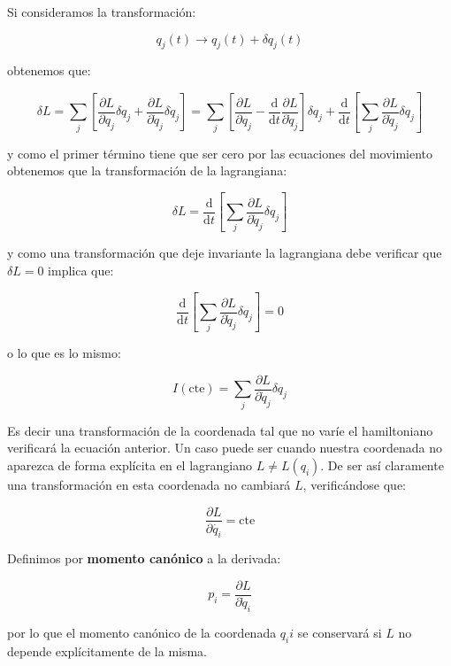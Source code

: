 \documentclass[12pt,a4paper]{book}
\newcommand{\parciales}[2]{\frac{\partial #1}{\partial #2}}
\newcommand{\ccorchetes}[1]{\left[ #1  \right]}
\newcommand{\D}{\mathrm{d}}
\begin{document}
Si consideramos la transformación:

\begin{equation}
q_j (t)   \longrightarrow q_j (t) + \delta q_j (t)
\end{equation}

obtenemos que:

\begin{equation}
\delta L = \sum_j \ccorchetes{\parciales{L}{q_j} \delta q_j + \parciales{L}{\dot{q}_j} \delta \dot{q}_j } = \sum_j \ccorchetes{\parciales{L}{q_j} - \dfrac{\D}{\D t} \parciales{L}{\dot{q}_j} } \delta q_j + \dfrac{\D}{\D t} \ccorchetes{\sum_j \parciales{L}{\dot{q}_j} \delta q_j }
\end{equation}

y como el primer término tiene que ser cero por las ecuaciones del movimiento obtenemos que la transformación de la lagrangiana:

\begin{equation}
\delta L = \dfrac{\D}{\D t} \ccorchetes{\sum_j \parciales{L}{\dot{q}_j} \delta q_j }
\end{equation}

y como una transformación que deje invariante la lagrangiana debe verificar que $\delta L = 0$ implica que:

$$ \dfrac{\D}{\D t} \ccorchetes{\sum_j \parciales{L}{\dot{q}_j} \delta q_j } = 0 $$

o lo que es lo mismo:

\begin{equation}
I (\mathrm{cte}) = \sum_j \parciales{L}{\dot{q}_j} \delta q_j
\end{equation}

Es decir una transformación de la coordenada tal que no varíe el hamiltoniano verificará la ecuación anterior. Un caso puede ser cuando nuestra coordenada no aparezca de forma explícita en el lagrangiano $L \neq L(q_i)$. De ser así claramente una transformación en esta coordenada no cambiará $L$, verificándose que:

$$ \parciales{L}{\dot{q_i}} = \mathrm{cte} $$

Definimos por \textbf{momento canónico} a la derivada:

\begin{equation}
p_i = \parciales{L}{\dot{q}_i}
\end{equation}

por lo que el momento canónico de la coordenada $q_ii$ se conservará si $L$ no depende explícitamente de la misma.
\end{document}
